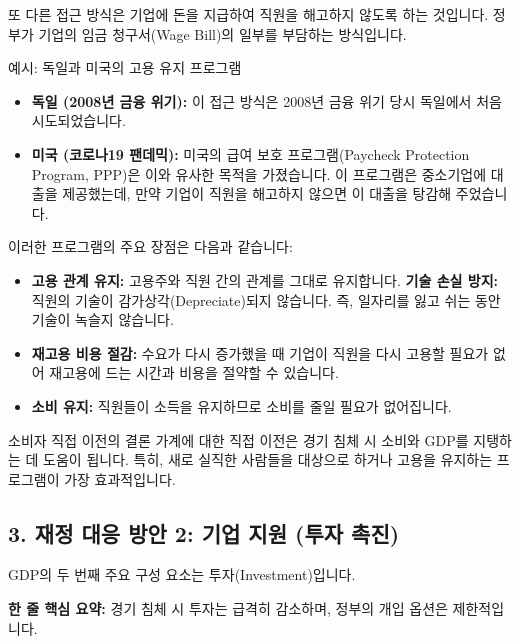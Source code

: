 \documentclass[11pt,a4paper]{article}
\theoremstyle{definition}
\begin{document}
또 다른 접근 방식은 기업에 돈을 지급하여 직원을 해고하지 않도록 하는 것입니다. 정부가 기업의 임금 청구서(Wage Bill)의 일부를 부담하는 방식입니다.

\begin{examplebox}{예시: 독일과 미국의 고용 유지 프로그램}
    \begin{itemize}
        \item \textbf{독일 (2008년 금융 위기):} 이 접근 방식은 2008년 금융 위기 당시 독일에서 처음 시도되었습니다.
        \item \textbf{미국 (코로나19 팬데믹):} 미국의 급여 보호 프로그램(Paycheck Protection Program, PPP)은 이와 유사한 목적을 가졌습니다. 이 프로그램은 중소기업에 대출을 제공했는데, 만약 기업이 직원을 해고하지 않으면 이 대출을 탕감해 주었습니다.
    \end{itemize}
\end{examplebox}

이러한 프로그램의 주요 장점은 다음과 같습니다:
\begin{itemize}
    \item \textbf{고용 관계 유지:} 고용주와 직원 간의 관계를 그대로 유지합니다.
    \textbf{기술 손실 방지:} 직원의 기술이 감가상각(Depreciate)되지 않습니다. 즉, 일자리를 잃고 쉬는 동안 기술이 녹슬지 않습니다.
    \item \textbf{재고용 비용 절감:} 수요가 다시 증가했을 때 기업이 직원을 다시 고용할 필요가 없어 재고용에 드는 시간과 비용을 절약할 수 있습니다.
    \item \textbf{소비 유지:} 직원들이 소득을 유지하므로 소비를 줄일 필요가 없어집니다.
\end{itemize}

\begin{summarybox}{소비자 직접 이전의 결론}
    가계에 대한 직접 이전은 경기 침체 시 소비와 GDP를 지탱하는 데 도움이 됩니다. 특히, 새로 실직한 사람들을 대상으로 하거나 고용을 유지하는 프로그램이 가장 효과적입니다.
\end{summarybox}

\newpage
\subsection{3. 재정 대응 방안 2: 기업 지원 (투자 촉진)}

GDP의 두 번째 주요 구성 요소는 투자(Investment)입니다.

\begin{tcolorbox}[mybox={경기 침체 시 투자의 변화}]
    \textbf{한 줄 핵심 요약:} 경기 침체 시 투자는 급격히 감소하며, 정부의 개입 옵션은 제한적입니다.
\end{tcolorbox}
\end{document}
